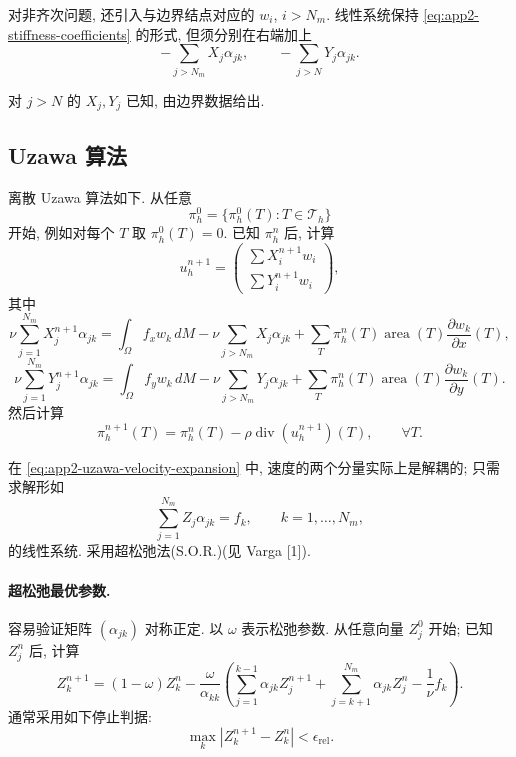 对非齐次问题, 还引入与边界结点对应的 $w_i$, $i>N_m$. 线性系统保持 \eqref{eq:app2-stiffness-coefficients} 的形式, 但须分别在右端加上
\[
-\sum_{j>N_m}X_j\alpha_{jk},
\qquad
-\sum_{j>N}Y_j\alpha_{jk}.
\]

\hypertarget{appendix-02-page-345}{}
对 $j>N$ 的 $X_j,Y_j$ 已知, 由边界数据给出.

\subsection{Uzawa 算法}
\label{subsec:app2-uzawa}

离散 Uzawa 算法如下. 从任意
\[
\pi_h^0=\{\pi_h^0(T):T\in\mathcal T_h\}
\]
开始, 例如对每个 $T$ 取 $\pi_h^0(T)=0$. 已知 $\pi_h^n$ 后, 计算
\begin{equation}
u_h^{n+1}=
\begin{pmatrix}\displaystyle\sum X_i^{n+1}w_i\\[1mm]
\displaystyle\sum Y_i^{n+1}w_i\end{pmatrix},
\label{eq:app2-uzawa-velocity-expansion}
\end{equation}
其中
\[
\nu\sum_{j=1}^{N_m}X_j^{n+1}\alpha_{jk}
=\int_\Omega f_xw_k\,dM
-\nu\sum_{j>N_m}X_j\alpha_{jk}
+\sum_T\pi_h^n(T)\operatorname{area}(T)\frac{\partial w_k}{\partial x}(T),
\]
\[
\nu\sum_{j=1}^{N_m}Y_j^{n+1}\alpha_{jk}
=\int_\Omega f_yw_k\,dM
-\nu\sum_{j>N_m}Y_j\alpha_{jk}
+\sum_T\pi_h^n(T)\operatorname{area}(T)\frac{\partial w_k}{\partial y}(T).
\]
然后计算
\begin{equation}
\pi_h^{n+1}(T)=\pi_h^n(T)-\rho\operatorname{div}(u_h^{n+1})(T),
\qquad\forall T.
\label{eq:app2-uzawa-pressure-update}
\end{equation}

在 \eqref{eq:app2-uzawa-velocity-expansion} 中, 速度的两个分量实际上是解耦的; 只需求解形如
\begin{equation}
\sum_{j=1}^{N_m}Z_j\alpha_{jk}=f_k,
\qquad k=1,\ldots,N_m,
\label{eq:app2-linear-system}
\end{equation}
的线性系统. 采用超松弛法(S.O.R.)(见 Varga [1]).

\paragraph{超松弛最优参数.}
容易验证矩阵 $(\alpha_{jk})$ 对称正定. 以 $\omega$ 表示松弛参数. 从任意向量 $Z_j^0$ 开始; 已知 $Z_j^n$ 后, 计算
\[
Z_k^{n+1}=(1-\omega)Z_k^n
-\frac{\omega}{\alpha_{kk}}
\left(\sum_{j=1}^{k-1}\alpha_{jk}Z_j^{n+1}
+\sum_{j=k+1}^{N_m}\alpha_{jk}Z_j^n-\frac1\nu f_k\right).
\]
通常采用如下停止判据:
\begin{equation}
\max_k|Z_k^{n+1}-Z_k^n|<\epsilon_{\mathrm{rel}}.
\label{eq:app2-sor-stopping-test}
\end{equation}


